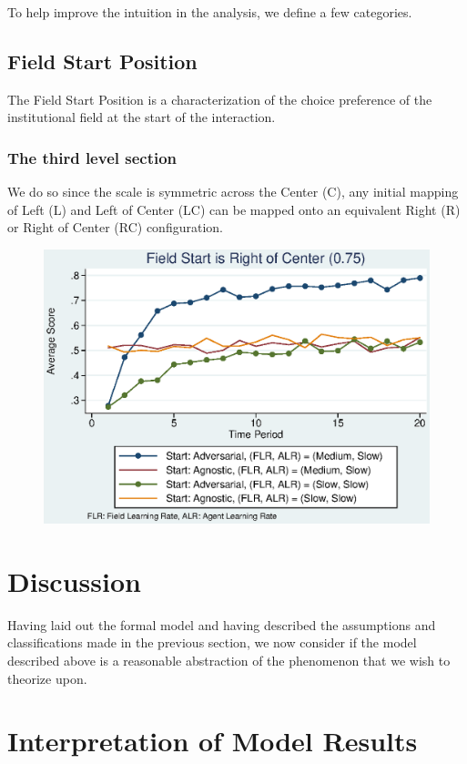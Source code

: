 \documentclass[12pt,letterpaper]{article}
\begin{document}
To help improve the intuition in the analysis, we define a few categories. 

\subsection{Field Start Position}
The Field Start Position is a characterization of the choice preference of the institutional field at the start of the interaction. 
\subsubsection{The third level section}
We do so since the scale is symmetric across the Center (C), any initial mapping of Left (L) and Left of Center (LC) can be mapped onto an equivalent Right (R) or Right of Center (RC) configuration. 

\begin{figure}[h]
\begin{centering}
  \caption{}
  \includegraphics[width=\textwidth]{frcmedium3a}
  \label{fig:3a}
\end{centering}
\end{figure}

\section{Discussion}
Having laid out the formal model and having described the assumptions and classifications made in the previous section, we now consider if the model described above is a reasonable abstraction of the phenomenon that we wish to theorize upon. 

\section{Interpretation of Model Results}
\end{document}
